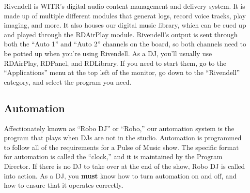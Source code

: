 \documentclass{witrman}
\begin{document}
Rivendell is WITR's digital audio content management and delivery system.  It is
made up of multiple different modules that generat logs, record voice tracks, play imaging,
and more.  It also houses our digital music library,
which can be cued up and played through the RDAirPlay module.  Rivendell's
output is sent through both the ``Auto 1'' and ``Auto 2'' channels on the board,
so both channels need to be potted up when you're using Rivendell.  As a DJ, you'll usually
use RDAirPlay, RDPanel, and RDLibrary. If you need to start them, go to the
``Applications'' menu at the top left of the monitor, go down to the
``Rivendell'' category, and select the program you need.

\subsection{Automation}

Affectionately known as ``Robo DJ'' or ``Robo,'' our automation system is the
program that plays when DJs are not in the studio.  Automation is programmed to
follow all of the requirements for a Pulse of Music show.  The specific format
for automation is called the ``clock,'' and it is maintained by the Program
Director.  If there is no DJ to take over at the end of the show, Robo DJ is
called into action.  As a DJ, you \textbf{must} know how to turn automation on
and off, and how to ensure that it operates correctly.
\end{document}
